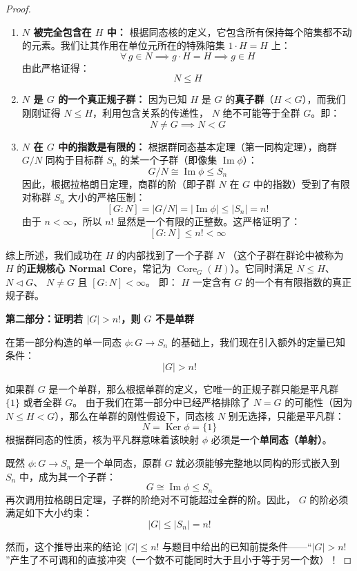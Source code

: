 \documentclass[]{article}
\begin{document}
\begin{proof}
\begin{enumerate}
	\item \textbf{$N$ 被完全包含在 $H$ 中：}
	根据同态核的定义，它包含所有保持每个陪集都不动的元素。我们让其作用在单位元所在的特殊陪集 $1 \cdot H = H$ 上：
	\[ \forall \, g \in N \implies g \cdot H = H \implies g \in H \]
	由此严格证得：
	\[ N \leqslant H \]
	
	\item \textbf{$N$ 是 $G$ 的一个真正规子群：}
	因为已知 $H$ 是 $G$ 的\textbf{真子群}（$H < G$），而我们刚刚证得 $N \leqslant H$，利用包含关系的传递性， $N$ 绝不可能等于全群 $G$。即：
	\[ N \neq G \implies N < G \]
	
	\item \textbf{$N$ 在 $G$ 中的指数是有限的：}
	根据群同态基本定理（第一同构定理），商群 $G/N$ 同构于目标群 $S_n$ 的某一个子群（即像集 $\operatorname{Im}\phi$）：
	\[ G/N \cong \operatorname{Im}\phi \leqslant S_n \]
	因此，根据拉格朗日定理，商群的阶（即子群 $N$ 在 $G$ 中的指数）受到了有限对称群 $S_n$ 大小的严格压制：
	\[ [G:N] = |G/N| = |\operatorname{Im}\phi| \leqslant |S_n| = n! \]
	由于 $n < \infty$，所以 $n!$ 显然是一个有限的正整数。这严格证明了：
	\[ [G:N] \leqslant n! < \infty \]
\end{enumerate}

综上所述，我们成功在 $H$ 的内部找到了一个子群 $N$ （这个子群在群论中被称为 $H$ 的\textbf{正规核心 Normal Core}，常记为 $\operatorname{Core}_G(H)$）。它同时满足 $N \leqslant H$、 $N \triangleleft G$、 $N \neq G$ 且 $[G:N] < \infty$。
即： $H$ 一定含有 $G$ 的一个有有限指数的真正规子群。

\bigskip
\noindent \textbf{第二部分：证明若 $|G| > n!$，则 $G$ 不是单群}

在第一部分构造的单一同态 $\phi: G \to S_n$ 的基础上，我们现在引入额外的定量已知条件：
\[ |G| > n! \]

如果群 $G$ 是一个单群，那么根据单群的定义，它唯一的正规子群只能是平凡群 $\{1\}$ 或者全群 $G$。
由于我们在第一部分中已经严格排除了 $N = G$ 的可能性（因为 $N \leqslant H < G$），那么在单群的刚性假设下，同态核 $N$ 别无选择，只能是平凡群：
\[ N = \operatorname{Ker}\phi = \{1\} \]
根据群同态的性质，核为平凡群意味着该映射 $\phi$ 必须是一个\textbf{单同态（单射）}。

既然 $\phi: G \to S_n$ 是一个单同态，原群 $G$ 就必须能够完整地以同构的形式嵌入到 $S_n$ 中，成为其一个子群：
\[ G \cong \operatorname{Im}\phi \leqslant S_n \]
再次调用拉格朗日定理，子群的阶绝对不可能超过全群的阶。因此， $G$ 的阶必须满足如下大小约束：
\[ |G| \leqslant |S_n| = n! \]

然而，这个推导出来的结论 $|G| \leqslant n!$ 与题目中给出的已知前提条件——“$|G| > n!$”产生了不可调和的直接冲突（一个数不可能同时大于且小于等于另一个数）！


\end{proof}
\end{document}
